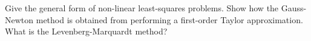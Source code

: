 \documentclass[12pt,a4paper]{article}
\begin{document}
    
    
	
	
	
    
    

\begin{question}
Give the general form of non-linear least-squares problems. Show how the Gauss-Newton method is obtained from performing a first-order Taylor approximation. What is the Levenberg-Marquardt method?
\end{question}
\end{document}
